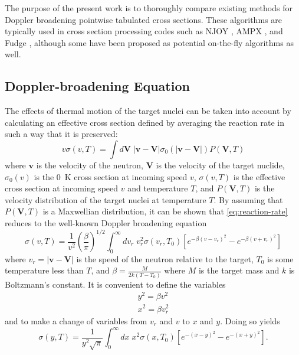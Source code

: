 \documentclass[3p,authoryear]{elsarticle}
\begin{document}
The purpose of the present work is to thoroughly compare existing methods for
Doppler broadening pointwise tabulated cross sections. These algorithms are
typically used in cross section processing codes such as NJOY
\citep{lanl-macfarlane-2012}, AMPX \citep{tans-dunn-2002}, and Fudge
\citep{nds-mattoon-2012}, although some have been proposed as potential
on-the-fly algorithms as well.

\subsection{Doppler-broadening Equation}

The effects of thermal motion of the target nuclei can be taken into account by
calculating an effective cross section defined by averaging the reaction rate in
such a way that it is preserved:
\begin{equation}
  \label{eq:reaction-rate}
  v \sigma(v,T) = \int d\mathbf{V} \; |\mathbf{v} - \mathbf{V}|
  \sigma_0(|\mathbf{v} - \mathbf{V}|) P(\mathbf{V},T)
\end{equation}
where $\mathbf{v}$ is the velocity of the neutron, $\mathbf{V}$ is the velocity
of the target nuclide, $\sigma_0(v)$ is the \SI{0}{\kelvin} cross section at
incoming speed $v$, $\sigma(v,T)$ is the effective cross section at incoming
speed $v$ and temperature $T$, and $P(\mathbf{V},T)$ is the velocity
distribution of the target nuclei at temperature $T$. By assuming that
$P(\mathbf{V},T)$ is a Maxwellian distribution, it can be shown that
\autoref{eq:reaction-rate} reduces to the well-known Doppler broadening equation
\citep{ornl-wigner-1944}
\begin{equation}
  \sigma (v,T) = \frac{1}{v^2} \left ( \frac{\beta}{\pi} \right )^{1/2}
  \int_0^{\infty} dv_r \; v_r^2 \sigma(v_r,T_0) \left [ e^{-\beta (v - v_r)^2} -
    e^{-\beta (v + v_r)^2} \right ]
\end{equation}
where $v_r = |\mathbf{v} - \mathbf{V}|$ is the speed of the neutron relative to
the target, $T_0$ is some temperature less than $T$, and $\beta = \frac{M}{2k(T
  - T_0)}$ where $M$ is the target mass and $k$ is Boltzmann's constant. It is
convenient to define the variables
\begin{eqnarray}
  y^2 = \beta v^2 \\
  x^2 = \beta v_r^2
\end{eqnarray}
and to make a change of variables from $v_r$ and $v$ to $x$ and $y$. Doing so
yields
\begin{equation}
  \label{eq:broaden-xy}
  \sigma (y,T) = \frac{1}{y^2\sqrt{\pi}} \int_0^{\infty} dx \; x^2 \sigma(x,T_0)
  \left [ e^{-(x - y)^2} - e^{-(x + y)^2} \right ].
\end{equation}
\end{document}
